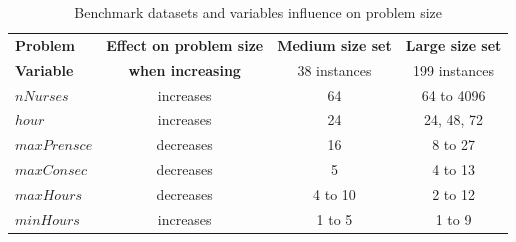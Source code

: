 \begin{table}[ht] 
\centering 
\begin{tabularx}{0.75\textwidth}{|l|c|c|c|}
\hline
\textbf{Problem} & \textbf{Effect on problem size}  & \textbf{Medium size set} & \textbf{Large size set} \\

\textbf{Variable}  		& \textbf{when increasing}  & 38 instances &  199 instances \\
\hline
\textbf{$nNurses$} & increases      &  64	&  64 to 4096 \\
\textbf{$hour$}   & increases		& 24	&  24, 48, 72 \\
\textbf{$maxPrensce$} & decreases	& 16	& 8 to 27 \\
\textbf{$maxConsec$} & decreases		& 5	&  4 to 13		\\
\textbf{$maxHours$} & decreases		& 4 to 10	& 2 to 12 \\
\textbf{$minHours$} & increases		& 1 to 5	& 1 to 9\\
\hline
\end{tabularx}
\caption{Benchmark datasets and variables influence on problem size}
\label{tab:ilp_size}
\end{table}


